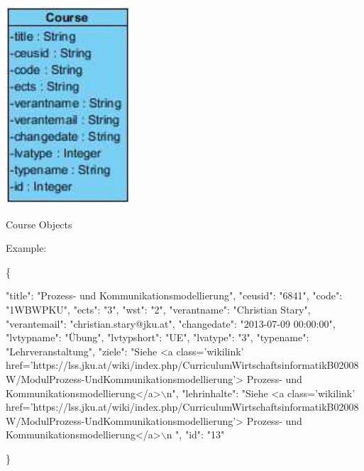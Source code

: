 \begin{DoxyImage}
\includegraphics{Course}
\caption{Course Objects}
\end{DoxyImage}
Example\+: 
\begin{DoxyCodeInclude}
\{

    \textcolor{stringliteral}{"title"}: \textcolor{stringliteral}{"Prozess- und Kommunikationsmodellierung"},
    \textcolor{stringliteral}{"ceusid"}: \textcolor{stringliteral}{"6841"},
    \textcolor{stringliteral}{"code"}: \textcolor{stringliteral}{"1WBWPKU"},
    \textcolor{stringliteral}{"ects"}: \textcolor{stringliteral}{"3"},
    \textcolor{stringliteral}{"wst"}: \textcolor{stringliteral}{"2"},
    \textcolor{stringliteral}{"verantname"}: \textcolor{stringliteral}{"Christian Stary"},
    \textcolor{stringliteral}{"verantemail"}: \textcolor{stringliteral}{"christian.stary@jku.at"},
    \textcolor{stringliteral}{"changedate"}: \textcolor{stringliteral}{"2013-07-09 00:00:00"},
    \textcolor{stringliteral}{"lvtypname"}: \textcolor{stringliteral}{"Übung"},
    \textcolor{stringliteral}{"lvtypshort"}: \textcolor{stringliteral}{"UE"},
    \textcolor{stringliteral}{"lvatype"}: \textcolor{stringliteral}{"3"},
    \textcolor{stringliteral}{"typename"}: \textcolor{stringliteral}{"Lehrveranstaltung"},
    \textcolor{stringliteral}{"ziele"}: \textcolor{stringliteral}{"Siehe <a class='wikilink'
       href='https://lss.jku.at/wiki/index.php/CurriculumWirtschaftsinformatikB02008W/ModulProzess-UndKommunikationsmodellierung'> Prozess- und Kommunikationsmodellierung</a>\(\backslash\)n"},
    \textcolor{stringliteral}{"lehrinhalte"}: \textcolor{stringliteral}{"Siehe <a class='wikilink'
       href='https://lss.jku.at/wiki/index.php/CurriculumWirtschaftsinformatikB02008W/ModulProzess-UndKommunikationsmodellierung'> Prozess- und Kommunikationsmodellierung</a>\(\backslash\)n
      "},
    \textcolor{stringliteral}{"id"}: \textcolor{stringliteral}{"13"}

\}
\end{DoxyCodeInclude}
